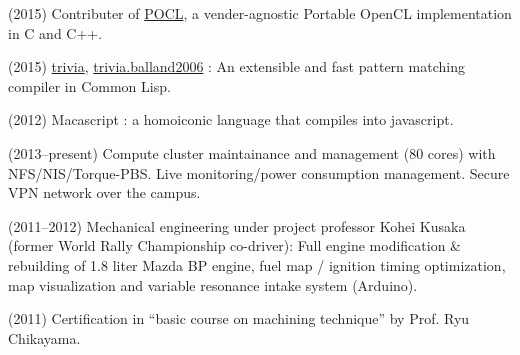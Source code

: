 \documentclass[letterpaper,12pt]{article}
\begin{document}
(2015) Contributer of \href{https://github.com/pocl/pocl}{POCL},
a vender-agnostic Portable OpenCL implementation in C and C++.

(2015) \href{https://github.com/guicho271828/trivia}{trivia},
\href{https://github.com/guicho271828/trivia.balland2006}{trivia.balland2006}
: An extensible and fast pattern matching compiler in Common Lisp.

(2012) Macascript : a homoiconic language that compiles into javascript.

(2013--present)
 Compute cluster maintainance and management (80 cores) with NFS/NIS/Torque-PBS.
 Live monitoring/power consumption management.
 Secure VPN network over the campus.

(2011--2012) Mechanical engineering under project professor Kohei Kusaka (former World Rally
 Championship co-driver):
 Full engine modification \& rebuilding of 1.8 liter Mazda BP engine,
 fuel map / ignition timing optimization, map visualization and
 variable resonance intake system (Arduino).

(2011) Certification in ``basic course on machining technique'' by Prof. Ryu Chikayama.



% 
% 
% 
\end{document}
